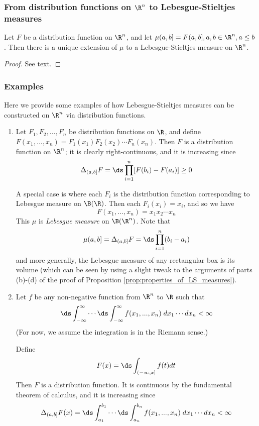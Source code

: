 \documentclass{article} %
\begin{document}
 \subsubsection{From distribution functions on $\R^n$ to Lebesgue-Stieltjes measures}
 
 \begin{theorem}
 Let $F$ be a distribution function on $\R^n$, and let $\mu(a,b] = F(a,b], a,b \in \R^n, a \leq b$. Then there is a unique extension of $\mu$ to a Lebesgue-Stieltjes measure on $\R^n$.	
 \end{theorem}
 
 \begin{proof}
 See text. 	
 \end{proof}

\subsubsection{Examples}

Here we provide some examples of how Lebesgue-Stieltjes measures can be constructed on $\R^n$ via distribution functions.

\begin{enumerate}
\item Let $F_1,F_2,...,F_n$ be distribution functions on $\R$, and define $F(x_1,...,x_n) = F_1(x_1) F_2(x_2) \cdots F_n(x_n)$.  Then $F$ is a distribution function on $\R^n$; it is clearly right-continuous, and it is increasing since
\[ \Delta_{(a,b]} F =\ds\prod_{i=1}^n [F(b_i) - F(a_i)] \geq 0 \]
	
A special case is where each $F_i$ is the distribution function corresponding to Lebesgue measure on $\B(\R)$.  Then each $F_i(x_i) = x_i$, and so we have
\[ F(x_1,...,x_n) = x_1x_2 \cdots x_n\]
This $\mu$ is \textit{Lebesgue measure} on $\B(\R^n)$.  Note that 
\[ \mu(a,b] = \Delta_{(a,b]} F = \ds\prod_{i=1}^n (b_i-a_i) \]
and more generally, the Lebesgue measure of any rectangular box is its volume (which can be seen by using a slight tweak to the arguments of parts (b)-(d) of the proof of Proposition \ref{prop:properties_of_LS_measures}). 
\item Let $f$ be any non-negative function from $\R^n$ to $\R$ such that 
\[ \ds\int_{-\infty}^\infty \cdots  \ds\int_{-\infty}^\infty f(x_1,...,x_n) \; dx_1 \cdots dx_n < \infty \]
(For now, we assume the integration is in the Riemann sense.)

Define 
\[ F(x) = \ds\int_{(-\infty,x]} f(t) dt \]
Then $F$ is a distribution function. It is continuous by the fundamental theorem of calculus, and it is increasing since
\[ \Delta_{(a,b]} F(x) = \ds\int_{a_1}^{b_1} \cdots  \ds\int_{a_n}^{b_n} f(x_1,...,x_n) \; dx_1 \cdots dx_n < \infty \]  
\end{enumerate}
\end{document}
